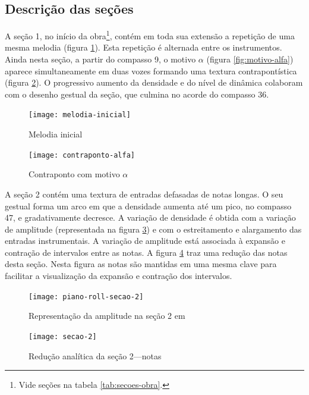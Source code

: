 \subsection{Descrição das seções}
\label{sec:descricao-das-secoes}

A seção 1, no início da obra\footnote{Vide seções na tabela
  \ref{tab:secoes-obra}.}, contém em toda sua extensão a repetição de
uma mesma melodia (figura \ref{fig:melodia-inicial}). Esta repetição é
alternada entre os instrumentos. Ainda nesta seção, a partir do
compasso 9, o motivo $\alpha$ (figura \ref{fig:motivo-alfa}) aparece
simultaneamente em duas vozes formando uma textura contrapontística
(figura \ref{fig:contraponto-alfa}). O progressivo aumento da
densidade e do nível de dinâmica colaboram com o desenho gestual da
seção, que culmina no acorde do compasso 36.

\begin{figure}
  \centering
  \texttt{[image: melodia-inicial]}
  \caption{Melodia inicial}
  \label{fig:melodia-inicial}
\end{figure}

\begin{figure}
  \centering
  \texttt{[image: contraponto-alfa]}
  \caption{Contraponto com motivo $\alpha$}
  \label{fig:contraponto-alfa}
\end{figure}

A seção 2 contém uma textura de entradas defasadas de notas longas. O
seu gestual forma um arco em que a densidade aumenta até um pico, no
compasso 47, e gradativamente decresce. A variação de densidade é
obtida com a variação de amplitude (representada na figura
\ref{fig:amplitude-secao-2}) e com o estreitamento e alargamento das
entradas instrumentais. A variação de amplitude está associada à
expansão e contração de intervalos entre as notas. A figura
\ref{fig:notas-secao-2} traz uma redução das notas desta seção. Nesta
figura as notas são mantidas em uma mesma clave para facilitar a
visualização da expansão e contração dos intervalos.

\begin{figure}
  \centering
  \texttt{[image: piano-roll-secao-2]}
  \caption{Representação da amplitude na seção 2 em }
  \label{fig:amplitude-secao-2}
\end{figure}

\begin{figure}
  \centering
  \texttt{[image: secao-2]}
  \caption{Redução analítica da seção 2---notas}
  \label{fig:notas-secao-2}
\end{figure}

